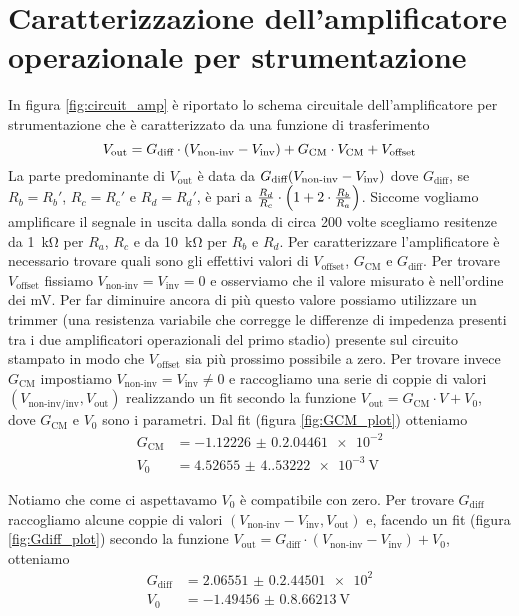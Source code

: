 \documentclass[
    prl,
    reprint, 
    superscriptaddress, 
    altaffilletter, 
    amsmath, 
    amssymb, 
    a4paper,
    varvw]{revtex4-2}
\begin{document}
\section{Caratterizzazione dell'amplificatore operazionale per strumentazione}\label{sec:appendix_strum_opamp}
In figura \ref{fig:circuit_amp} è riportato lo schema circuitale dell'amplificatore per strumentazione che  è caratterizzato da una funzione di trasferimento \begin{equation}
    V_\text{out} = G_\text{diff}\cdot \qty(V_\text{non-inv}-V_\text{inv}) +  G_\text{CM}\cdot V_\text{CM} + V_\text{offset} 
\end{equation}
La parte predominante di $V_\text{out}$ è data da $G_\text{diff}\qty(V_\text{non-inv}-V_\text{inv})$ dove $G_\text{diff}$, se $R_b=R_b'$, $R_c=R_c'$ e $R_d=R_d'$, è pari a $\frac{R_{d}}{R_{c}}\cdot \qty(1+2\cdot \frac{R_{b}}{R_{a}})$. Siccome vogliamo amplificare il segnale in uscita dalla sonda di circa 200 volte scegliamo resitenze da \SI{1}{\kilo\ohm} per $R_a$, $R_c$ e da \SI{10}{\kilo\ohm} per $R_b$ e $R_d$. Per caratterizzare l'amplificatore è necessario trovare quali sono gli effettivi valori di $V_\text{offset}$, $G_\text{CM}$ e $G_\text{diff}$. 
Per trovare $V_\text{offset}$ fissiamo $V_\text{non-inv}=V_\text{inv}=0$ e osserviamo che il valore misurato è nell'ordine dei \si{\milli\volt}. Per far diminuire ancora di più questo valore possiamo utilizzare un trimmer (una resistenza variabile che corregge le differenze di impedenza presenti tra i due amplificatori operazionali del primo stadio) presente sul circuito stampato in modo che $V_\text{offset}$ sia più prossimo possibile a zero.
Per trovare invece $G_\text{CM}$ impostiamo $V_\text{non-inv}=V_\text{inv}\neq 0$ e raccogliamo una serie di coppie di valori $(V_\text{non-inv/inv},V_\text{out})$ realizzando un fit secondo la funzione $V_\text{out}=G_\text{CM}\cdot V+V_0$, dove $G_\text{CM}$ e $V_0$ sono i parametri. Dal fit (figura \ref{fig:GCM_plot}) otteniamo \begin{align*}
    G_\text{CM} &= \num{-1.12226(0.204461)e-2}\\
    V_0 &= \SI{4.52655(4.53222)e-3}{\volt}
\end{align*}

Notiamo che come ci aspettavamo $V_0$ è compatibile con zero.
Per trovare $G_\text{diff}$  raccogliamo alcune coppie di valori $(V_\text{non-inv}-V_\text{inv},V_\text{out})$ e, facendo un fit (figura \ref{fig:Gdiff_plot}) secondo la funzione $V_\text{out}=G_\text{diff}\cdot (V_\text{non-inv}-V_\text{inv})+V_0$, otteniamo \begin{align*}
    G_\text{diff} &= \num{2.06551(0.244501)e2}\\
    V_0 &= \SI{-1.49456(0.866213)}{\volt}
\end{align*}
\end{document}

